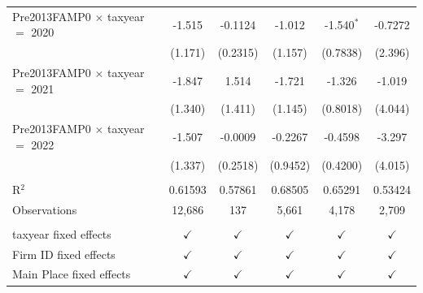 \begin{tabular}{lccccc}
   Pre2013FAMP0 $\times$ taxyear $=$ 2020  & -1.515        & -0.1124        & -1.012         & -1.540$^{*}$  & -0.7272\\   
                                           & (1.171)       & (0.2315)       & (1.157)        & (0.7838)      & (2.396)\\   
   Pre2013FAMP0 $\times$ taxyear $=$ 2021  & -1.847        & 1.514          & -1.721         & -1.326        & -1.019\\   
                                           & (1.340)       & (1.411)        & (1.145)        & (0.8018)      & (4.044)\\   
   Pre2013FAMP0 $\times$ taxyear $=$ 2022  & -1.507        & -0.0009        & -0.2267        & -0.4598       & -3.297\\   
                                           & (1.337)       & (0.2518)       & (0.9452)       & (0.4200)      & (4.015)\\   
    \\
   R$^2$                                   & 0.61593       & 0.57861        & 0.68505        & 0.65291       & 0.53424\\  
   Observations                            & 12,686        & 137            & 5,661          & 4,178         & 2,709\\  
    \\
   taxyear fixed effects                   & $\checkmark$  & $\checkmark$   & $\checkmark$   & $\checkmark$  & $\checkmark$\\   
   Firm ID fixed effects                   & $\checkmark$  & $\checkmark$   & $\checkmark$   & $\checkmark$  & $\checkmark$\\   
   Main Place fixed effects                & $\checkmark$  & $\checkmark$   & $\checkmark$   & $\checkmark$  & $\checkmark$\\   
   \bottomrule
\end{tabular}
\par\endgroup
